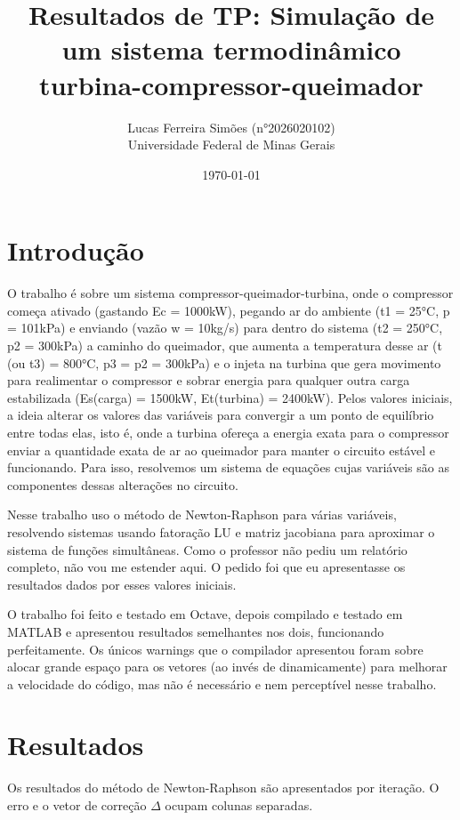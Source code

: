 \documentclass[11pt]{article}
\title{Resultados de TP: Simulação de um sistema termodinâmico turbina-compressor-queimador}
\author{Lucas Ferreira Simões (n°2026020102)\\Universidade Federal de Minas Gerais}
\date{\today}
\begin{document}
\maketitle

\section{Introdução}

O trabalho é sobre um sistema compressor-queimador-turbina, onde o compressor começa ativado (gastando Ec = 1000kW), pegando ar do ambiente (t1 = 25°C, p = 101kPa) e enviando (vazão w = 10kg/s) para dentro do sistema (t2 = 250°C, p2 = 300kPa) a caminho do queimador, que aumenta a temperatura desse ar (t (ou t3) = 800°C, p3 = p2 = 300kPa) e o injeta na turbina que gera movimento para realimentar o compressor e sobrar energia para qualquer outra carga estabilizada (Es(carga) = 1500kW, Et(turbina) = 2400kW). Pelos valores iniciais, a ideia alterar os valores das variáveis para convergir a um ponto de equilíbrio entre todas elas, isto é, onde a turbina ofereça a energia exata para o compressor enviar a quantidade exata de ar ao queimador para manter o circuito estável e funcionando. Para isso, resolvemos um sistema de equações cujas variáveis são as componentes dessas alterações no circuito.

Nesse trabalho uso o método de Newton-Raphson para várias variáveis, resolvendo sistemas usando fatoração LU e matriz jacobiana para aproximar o sistema de funções simultâneas. Como o professor não pediu um relatório completo, não vou me estender aqui. O pedido foi que eu apresentasse os resultados dados por esses valores iniciais.

O trabalho foi feito e testado em Octave, depois compilado e testado em MATLAB e apresentou resultados semelhantes nos dois, funcionando perfeitamente. Os únicos warnings que o compilador apresentou foram sobre alocar grande espaço para os vetores (ao invés de dinamicamente) para melhorar a velocidade do código, mas não é necessário e nem perceptível nesse trabalho.


\section{Resultados}

Os resultados do método de Newton-Raphson são apresentados por iteração. O erro e o vetor de correção $\Delta$ ocupam colunas separadas.
\end{document}
